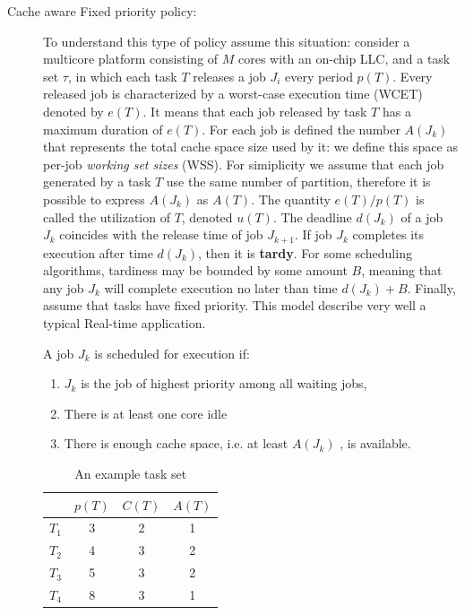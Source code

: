 \begin{description}
\item[Cache aware Fixed priority policy:] To understand this type of policy assume this situation: consider a multicore platform consisting of $M$ cores 
with an on-chip LLC, and a task set $\tau$, in which each task $T$ releases a job $J_i$ every period $p(T)$. Every released job is characterized by a 
worst-case execution time (WCET) denoted by $e(T)$. It means that each job released by task $T$ has a maximum duration of $e(T)$. For each job is defined 
the number $A(J_k)$ that represents the total cache space size used by it: we define this space as per-job \textit{working set sizes} (WSS). 
For simiplicity we assume that each job generated by a task $T$ use the same number of partition, therefore it is possible to express $A(J_k)$ as $A(T)$. 
The quantity $e(T)/p(T)$ is called the utilization of $T$, denoted $u(T)$. The deadline $d(J_k)$ of a job $J_k$ coincides with the release time of job 
$J_{k+1}$. If job $J_k$ completes its execution after time $d(J_k)$, then it is \textbf{tardy}. For some scheduling algorithms, tardiness may be bounded 
by some amount $B$, meaning that any job $J_k$ will complete execution no later than time $d(J_k)+B$. Finally, assume that tasks have fixed priority.
This model describe very well a typical Real-time application.

A job $J_k$ is scheduled for execution if:

\begin{enumerate}
	\item $J_k$ is the job of highest priority among all waiting jobs,
	\item There is at least one core idle
	\item There is enough cache space, i.e. at least $A(J_k)$ , is available.
\end{enumerate}

\begin{table}[htbp]
\begin{center}
\begin{tabular}{l|c|c|c}
	\hline
	& $p(T)$ & $C(T)$ & $A(T)$ \\ \hline
	$T_1$ & 3 & 2 & 1 \\ \hline
	$T_2$ & 4 & 3 & 2 \\ \hline
	$T_3$ & 5 & 3 & 2 \\ \hline
	$T_4$ & 8 & 3 & 1 \\ 
	\hline
\end{tabular}
\caption{An example task set}
\label{tab:cache_task_set}
\end{center}
\end{table}


\end{description}
